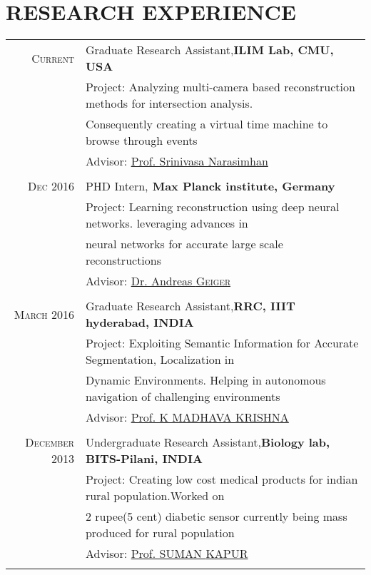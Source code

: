 \documentclass[a4paper,10pt]{article}
\begin{document}
\section{RESEARCH EXPERIENCE} 
\begin{tabular}{rl}	
 \textsc{Current} &  Graduate Research Assistant,\bf{ILIM Lab, CMU, USA}\\
 & Project: Analyzing multi-camera based reconstruction methods for intersection analysis. \\ & Consequently creating a virtual time machine to browse through events\\
 & \small Advisor: \href{http://www.cs.cmu.edu/~srinivas/} {Prof. Srinivasa Narasimhan} \\&\\

 \textsc{Dec 2016} &  PHD Intern,\bf{ Max Planck institute, Germany}\\
& Project: Learning reconstruction using deep neural networks. leveraging advances in \\  
& neural networks for accurate large scale reconstructions\\
&\small Advisor: \href{http://www.cvlibs.net/} {Dr. Andreas \textsc{Geiger}} \\&\\

 \textsc{March 2016} &  Graduate Research Assistant,\bf{RRC, IIIT hyderabad, INDIA}\\
 & Project: Exploiting Semantic Information for Accurate Segmentation, Localization in \\ & Dynamic Environments. Helping in autonomous navigation of challenging environments\\
 &\normalsize  \small Advisor: \href{https://www.iiit.ac.in/people/faculty/mkrishna/} {Prof. K MADHAVA \textsc{KRISHNA}} \\&\\

 \textsc{December 2013} &  Undergraduate Research Assistant,\bf{Biology lab, BITS-Pilani, INDIA}\\
 & Project: Creating low cost medical products for indian rural population.Worked on \\ & 2 rupee(5 cent) diabetic sensor currently being mass produced for rural population\\
&\normalsize \small Advisor: 
\href{http://www.bits-pilani.ac.in/Hyderabad/sumankapur/Profile} {Prof. SUMAN \textsc{KAPUR}}\\&\\


\end{tabular}
\end{document}
